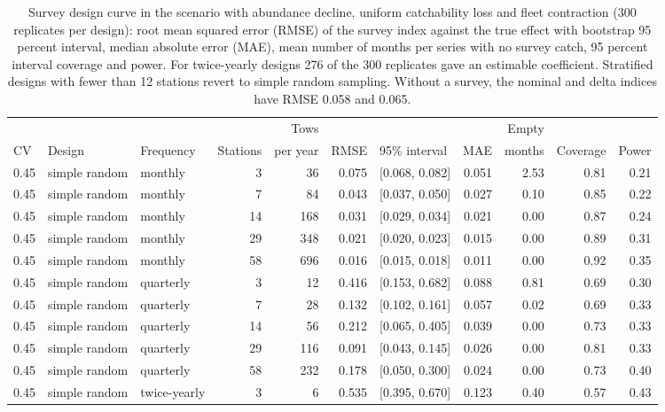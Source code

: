 \documentclass[11pt,a4paper]{article}
\begin{document}
\begin{table}[htbp]
\centering\scriptsize
\setlength{\tabcolsep}{2.5pt}
\caption{Survey design curve in the scenario with abundance decline, uniform catchability loss and fleet contraction (300 replicates per design): root mean squared error (RMSE) of the survey index against the true effect with bootstrap 95 percent interval, median absolute error (MAE), mean number of months per series with no survey catch, 95 percent interval coverage and power. For twice-yearly designs 276 of the 300 replicates gave an estimable coefficient. Stratified designs with fewer than 12 stations revert to simple random sampling. Without a survey, the nominal and delta indices have RMSE 0.058 and 0.065.}
\label{tab:designcurve}
\begin{tabular}{@{}lllrrrlrrrr@{}}
\toprule
& & & & Tows & & & & Empty & & \\
CV & Design & Frequency & Stations & per year & RMSE & 95\% interval & MAE & months & Coverage & Power \\
\midrule
0.45 & simple random & monthly &  3 &  36 & 0.075 & [0.068, 0.082] & 0.051 & 2.53 & 0.81 & 0.21 \\
0.45 & simple random & monthly &  7 &  84 & 0.043 & [0.037, 0.050] & 0.027 & 0.10 & 0.85 & 0.22 \\
0.45 & simple random & monthly & 14 & 168 & 0.031 & [0.029, 0.034] & 0.021 & 0.00 & 0.87 & 0.24 \\
0.45 & simple random & monthly & 29 & 348 & 0.021 & [0.020, 0.023] & 0.015 & 0.00 & 0.89 & 0.31 \\
0.45 & simple random & monthly & 58 & 696 & 0.016 & [0.015, 0.018] & 0.011 & 0.00 & 0.92 & 0.35 \\
0.45 & simple random & quarterly &  3 &  12 & 0.416 & [0.153, 0.682] & 0.088 & 0.81 & 0.69 & 0.30 \\
0.45 & simple random & quarterly &  7 &  28 & 0.132 & [0.102, 0.161] & 0.057 & 0.02 & 0.69 & 0.33 \\
0.45 & simple random & quarterly & 14 &  56 & 0.212 & [0.065, 0.405] & 0.039 & 0.00 & 0.73 & 0.33 \\
0.45 & simple random & quarterly & 29 & 116 & 0.091 & [0.043, 0.145] & 0.026 & 0.00 & 0.81 & 0.33 \\
0.45 & simple random & quarterly & 58 & 232 & 0.178 & [0.050, 0.300] & 0.024 & 0.00 & 0.73 & 0.40 \\
0.45 & simple random & twice-yearly &  3 &   6 & 0.535 & [0.395, 0.670] & 0.123 & 0.40 & 0.57 & 0.43 \\

\end{tabular}
\end{table}
\end{document}
